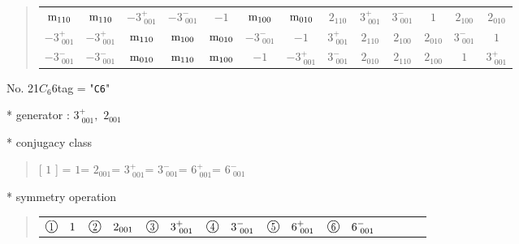 \documentclass[fleqn,10pt,landscape]{jsarticle}
\begin{document}
\begin{quote}
\begin{tabular}{ccccccccccccc}
$ {\rm m}_{110} $ & $ {\rm m}_{110} $ & $ -3^{+}_{\,\,001} $ & $ -3^{-}_{\,\,001} $ & $ -1 $ & $ {\rm m}_{100} $ & $ {\rm m}_{010} $ & $ 2{}_{110} $ & $ 3^{+}_{\,\,001} $ & $ 3^{-}_{\,\,001} $ & $ 1 $ & $ 2{}_{100} $ & $ 2{}_{010} $ \\
$ -3^{+}_{\,\,001} $ & $ -3^{+}_{\,\,001} $ & $ {\rm m}_{110} $ & $ {\rm m}_{100} $ & $ {\rm m}_{010} $ & $ -3^{-}_{\,\,001} $ & $ -1 $ & $ 3^{+}_{\,\,001} $ & $ 2{}_{110} $ & $ 2{}_{100} $ & $ 2{}_{010} $ & $ 3^{-}_{\,\,001} $ & $ 1 $ \\
$ -3^{-}_{\,\,001} $ & $ -3^{-}_{\,\,001} $ & $ {\rm m}_{010} $ & $ {\rm m}_{110} $ & $ {\rm m}_{100} $ & $ -1 $ & $ -3^{+}_{\,\,001} $ & $ 3^{-}_{\,\,001} $ & $ 2{}_{010} $ & $ 2{}_{110} $ & $ 2{}_{100} $ & $ 1 $ & $ 3^{+}_{\,\,001} $ \\
 \hline \hline
\end{tabular}
\end{quote}

\newpage

No. 21\quad$C_{6}$\quad$6$\quad[ hexagonal ]
tag = "{\tt C6}"

* generator : $3^{+}_{\,\,001},\,\,2{}_{001}$

* conjugacy class
\begin{quote}
[ $1$ ] = \quad $1$\newline[ $2{}_{001}$ ] = \quad $2{}_{001}$\newline[ $3^{+}_{\,\,001}$ ] = \quad $3^{+}_{\,\,001}$\newline[ $3^{-}_{\,\,001}$ ] = \quad $3^{-}_{\,\,001}$\newline[ $6^{+}_{\,\,001}$ ] = \quad $6^{+}_{\,\,001}$\newline[ $6^{-}_{\,\,001}$ ] = \quad $6^{-}_{\,\,001}$\newline
\end{quote}

* symmetry operation
\begin{quote}
\begin{tabular}{llllllllll}
$ {\ooalign{\hfil\resizebox{.8\width}{\height}{1}\hfil\crcr\raise.1ex\hbox{\large$\bigcirc$}}}\quad 1 $ & $ {\ooalign{\hfil\resizebox{.8\width}{\height}{2}\hfil\crcr\raise.1ex\hbox{\large$\bigcirc$}}}\quad 2{}_{001} $ & $ {\ooalign{\hfil\resizebox{.8\width}{\height}{3}\hfil\crcr\raise.1ex\hbox{\large$\bigcirc$}}}\quad 3^{+}_{\,\,001} $ & $ {\ooalign{\hfil\resizebox{.8\width}{\height}{4}\hfil\crcr\raise.1ex\hbox{\large$\bigcirc$}}}\quad 3^{-}_{\,\,001} $ & $ {\ooalign{\hfil\resizebox{.8\width}{\height}{5}\hfil\crcr\raise.1ex\hbox{\large$\bigcirc$}}}\quad 6^{+}_{\,\,001} $ & $ {\ooalign{\hfil\resizebox{.8\width}{\height}{6}\hfil\crcr\raise.1ex\hbox{\large$\bigcirc$}}}\quad 6^{-}_{\,\,001} $
\end{tabular}
\end{quote}
\end{document}
